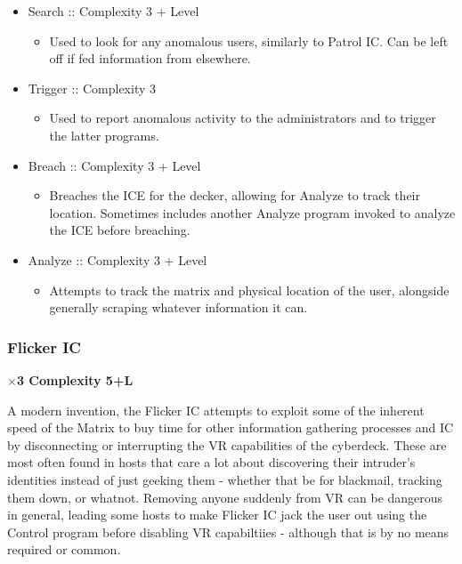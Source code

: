 \begin{multicols}{2}
	\begin{itemize}
		\itemsep 0pt
		\item Search :: Complexity 3 + Level
		\begin{itemize}
			\itemsep 0pt
			\item Used to look for any anomalous users, similarly to Patrol IC. Can be left off if fed information from elsewhere.
		\end{itemize}
		\item Trigger :: Complexity 3
		\begin{itemize}
			\itemsep 0pt
			\item Used to report anomalous activity to the administrators and to trigger the latter programs.
		\end{itemize}
		\item Breach :: Complexity 3 + Level
		\begin{itemize}
			\itemsep 0pt
			\item Breaches the ICE for the decker, allowing for Analyze to track their location. Sometimes includes another Analyze program invoked to analyze the ICE before breaching.
		\end{itemize}
		\item Analyze :: Complexity 3 + Level
		\begin{itemize}
			\itemsep 0pt
			\item Attempts to track the matrix and physical location of the user, alongside generally scraping whatever information it can.
		\end{itemize}
	\end{itemize}
	
	\subsubsection{Flicker IC}
	
	\textbf{$\times$3 Complexity 5+L}
	
	A modern invention, the Flicker IC attempts to exploit some of the inherent speed of the Matrix to buy time for other information gathering processes and IC by disconnecting or interrupting the VR capabilities of the cyberdeck. These are most often found in hosts that care a lot about discovering their intruder's identities instead of just geeking them - whether that be for blackmail, tracking them down, or whatnot. Removing anyone suddenly from VR can be dangerous in general, leading some hosts to make Flicker IC jack the user out using the Control program before disabling VR capabiltiies - although that is by no means required or common.
	

\end{multicols}
